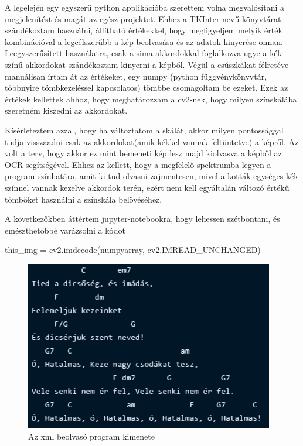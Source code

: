 
A legelején egy egyszerű python applikációba szerettem volna megvalósítani a megjelenítést és magát az egész projektet. Ehhez a TKInter nevű könyvtárat szándékoztam használni, állítható értékekkel, hogy megfigyeljem melyik érték kombinációval a legcélszerűbb a kép beolvasása és az adatok kinyerése onnan. Leegyszerűsített használatra, csak a sima akkordokkal foglalkozva ugye a kék színű akkordokat szándékoztam kinyerni a képből. Végül a csúszkákat félretéve manuálisan írtam át az értékeket, egy numpy (python függvénykönyvtár, többnyire tömbkezeléssel kapcsolatos) tömbbe csomagoltam be ezeket. Ezek az értékek kellettek ahhoz, hogy meghatározzam a cv2-nek, hogy milyen színskálába szeretném kiszedni az akkordokat. 
\par
Kísérleteztem azzal, hogy ha változtatom a skálát, akkor milyen pontossággal tudja visszaadni csak az akkordokat(amik kékkel vannak feltüntetve) a képről. Az volt a terv, hogy akkor ez mint bemeneti kép lesz majd kiolvasva a képből az OCR segítségével. Ehhez az kellett, hogy a megfelelő spektrumba legyen a program színhatára, amit ki tud olvasni zajmentesen, mivel a kották egységes kék színnel vannak kezelve akkordok terén, ezért nem kell egyáltalán változó értékű tömböket használni a színskála belövéséhez.
\par

A következőkben áttértem jupyter-notebookra, hogy lehessen szétbontani, és emészthetőbbé varázsolni a kódot

\begin{python}
this_img = cv2.imdecode(numpyarray, cv2.IMREAD_UNCHANGED)	
\end{python}

\begin{figure}[h]
	\includegraphics[scale=1]{images/output_tied.png}
	\caption{Az xml beolvasó program kimenete}
	\label{fig:output1}
\end{figure}

